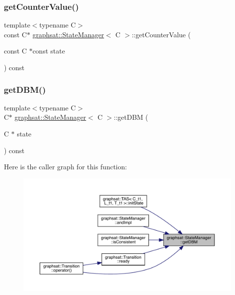 \subsubsection{\texorpdfstring{getCounterValue()}{getCounterValue()}\hspace{0.1cm}{\footnotesize\ttfamily [2/2]}}
{\footnotesize\ttfamily template$<$typename C$>$ \\
const C$\ast$ \mbox{\hyperlink{classgraphsat_1_1_state_manager}{graphsat\+::\+State\+Manager}}$<$ C $>$\+::get\+Counter\+Value (\begin{DoxyParamCaption}\item[{const C $\ast$const}]{state }\end{DoxyParamCaption}) const\hspace{0.3cm}{\ttfamily [inline]}}

\mbox{\label{classgraphsat_1_1_state_manager_a2fcbd8faf072e13ffbd53e5b70e5a236}} 
\subsubsection{\texorpdfstring{getDBM()}{getDBM()}\hspace{0.1cm}{\footnotesize\ttfamily [1/2]}}
{\footnotesize\ttfamily template$<$typename C$>$ \\
C$\ast$ \mbox{\hyperlink{classgraphsat_1_1_state_manager}{graphsat\+::\+State\+Manager}}$<$ C $>$\+::get\+D\+BM (\begin{DoxyParamCaption}\item[{C $\ast$}]{state }\end{DoxyParamCaption}) const\hspace{0.3cm}{\ttfamily [inline]}}

Here is the caller graph for this function\+:
\nopagebreak
\begin{figure}[H]
\begin{center}
\leavevmode
\includegraphics[width=350pt]{classgraphsat_1_1_state_manager_a2fcbd8faf072e13ffbd53e5b70e5a236_icgraph}
\end{center}
\end{figure}
\mbox{\label{classgraphsat_1_1_state_manager_af12960475f91f6c20ebfc19e07f58db1}} 
